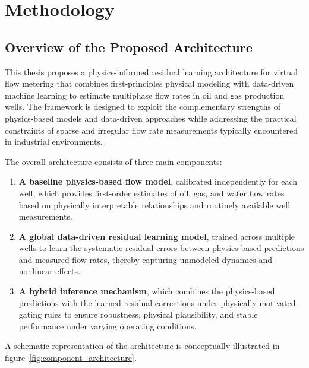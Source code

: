 \documentclass[12pt,APA]{uomthesis}
\begin{document}
\chapter{Methodology}
\label{ch:methodology}

\section {Overview of the Proposed Architecture}
This thesis proposes a physics-informed residual learning architecture for virtual flow metering that combines first-principles physical modeling with data-driven machine learning to estimate multiphase flow rates in oil and gas production wells. The framework is designed to exploit the complementary strengths of physics-based models and data-driven approaches while addressing the practical constraints of sparse and irregular flow rate measurements typically encountered in industrial environments.

The overall architecture consists of three main components:

\begin{enumerate}
    \item \textbf{A baseline physics-based flow model}, calibrated independently for each well, which provides first-order estimates of oil, gas, and water flow rates based on physically interpretable relationships and routinely available well measurements.
    \item \textbf{A global data-driven residual learning model}, trained across multiple wells to learn the systematic residual errors between physics-based predictions and measured flow rates, thereby capturing unmodeled dynamics and nonlinear effects.
    \item \textbf{A hybrid inference mechanism}, which combines the physics-based predictions with the learned residual corrections under physically motivated gating rules to ensure robustness, physical plausibility, and stable performance under varying operating conditions.
\end{enumerate}

A schematic representation of the architecture is conceptually illustrated in figure~\ref{fig:component_architecture}.
\end{document}
